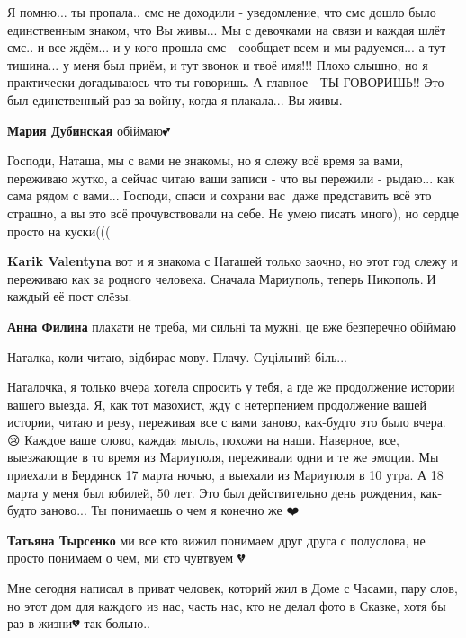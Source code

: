 
Я помню... ты пропала.. смс не доходили - уведомление, что смс дошло было
единственным знаком, что Вы живы... Мы с девочками на связи и каждая шлёт смс..
и все ждём... и у кого прошла смс - сообщает всем и мы радуемся... а тут
тишина... у меня был приём, и тут звонок и твоё имя!!! Плохо слышно, но я
практически догадываюсь что ты говоришь. А главное - ТЫ ГОВОРИШЬ!! Это был
единственный раз за войну, когда я плакала... Вы живы.

\begin{itemize} %
\textbf{Мария Дубинская} обіймаю💕
\end{itemize} %


Господи, Наташа, мы с вами не знакомы, но я слежу всё время за вами, переживаю
жутко, а сейчас читаю ваши записи - что вы пережили - рыдаю... как сама рядом с
вами... Господи, спаси и сохрани вас🙏 даже представить всё это страшно, а вы это
всё прочувствовали на себе. Не умею писать много), но сердце просто на куски(((

\begin{itemize} %
\textbf{Karik Valentyna} вот и я знакома с Наташей только заочно, но этот год слежу и переживаю как за родного человека. Сначала Мариуполь, теперь Никополь.🙏И каждый её пост слëзы.

\textbf{Анна Филина} плакати не треба, ми сильні та мужні, це вже безперечно💞обіймаю
\end{itemize} %


Наталка, коли читаю, відбирає мову. Плачу. Суцільний біль...


Наталочка, я только вчера хотела спросить у тебя, а где же продолжение истории
вашего выезда. Я, как тот мазохист, жду с нетерпением продолжение вашей
истории, читаю и реву, переживая все с вами заново, как-будто это было вчера.
😢 Каждое ваше слово, каждая мысль, похожи на наши. Наверное, все, выезжающие в
то время из Мариуполя, переживали одни и те же эмоции. Мы приехали в Бердянск
17 марта ночью, а выехали из Мариуполя в 10 утра. А 18 марта у меня был юбилей,
50 лет. Это был действительно день рождения, как-будто заново... Ты понимаешь о
чем я конечно же ❤️

\begin{itemize} %
\textbf{Татьяна Тырсенко} ми все кто вижил понимаем друг друга с полуслова, не просто понимаем о чем, ми єто чувтвуем 💔

Мне сегодня написал в приват человек, которий жил в Доме с Часами, пару слов,
но этот дом для каждого из нас, часть нас, кто не делал фото в Сказке, хотя бы
раз в жизни💔 так больно..

\end{itemize} %

